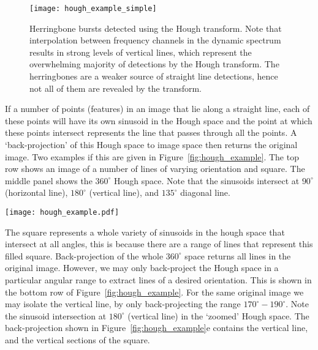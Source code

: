 \begin{figure}[t!]
\begin{center}
\texttt{[image: hough\_example\_simple]}
\caption[Hough transform herringbones]{Herringbone bursts detected using the Hough transform. Note that interpolation between frequency channels in the dynamic spectrum results in strong levels of vertical lines, which represent the overwhelming majority of detections by the Hough transform. The herringbones are a weaker source of straight line detections, hence not all of them are revealed by the transform.}
\label{fig:hough0}
\end{center}
\end{figure}
If a number of points (features) in an image that lie along a straight line, each of these points will have its own sinusoid in the Hough space and the point at which these points intersect represents the line that passes through all the points. A `back-projection' of this Hough space to image space then returns the original image. Two examples if this are given in Figure~\ref{fig:hough_example}. The top row shows an image of a number of lines of varying orientation and square. The middle panel shows the $360^{\circ}$ Hough space. Note that the sinusoids intersect at $90^{\circ}$ (horizontal line), $180^{\circ}$ (vertical line), and $135^{\circ}$ diagonal line. 
\begin{sidewaysfigure}
\centering
\texttt{[image: hough\_example.pdf]}
\caption[Example Hough Transform]{(a) An image with a number of lines of varying orientation and intensity. (b) The Hough transform of the image in $(r, \theta)$ space. The multiple intersection points at $90^{\circ}$ and a variety of radii correspond to the multiple horizontal lines in the original image. There are also intersection points at $135^{\circ}$ (diagonal line in original image) and $180^{\circ}$ (vertical) line. (c) The back projected Hough transform, recovering all features in the original image. The bottom row (d)-(f) show the same as the top row, expect that the back-projection is chosen over a region in hough space that only contains the vertical line. In this way only the vertical line is recovered and the remaining features are not recovered.}
\label{fig:hough_example}
\end{sidewaysfigure}
The square represents a whole variety of sinusoids in the hough space that intersect at all angles, this is because there are a range of lines that represent this filled square. Back-projection of the whole $360^{\circ}$ space returns all lines in the original image. However, we may only back-project the Hough space in a particular angular range to extract lines of a desired orientation. This is shown in the bottom row of Figure~\ref{fig:hough_example}. For the same original image we may isolate the vertical line, by only back-projecting the range $170^{\circ}-190^{\circ}$. Note the sinusoid intersection at $180^{\circ}$ (vertical line) in the `zoomed' Hough space. The back-projection shown in Figure~\ref{fig:hough_example}e contains the vertical line, and the vertical sections of the square.
